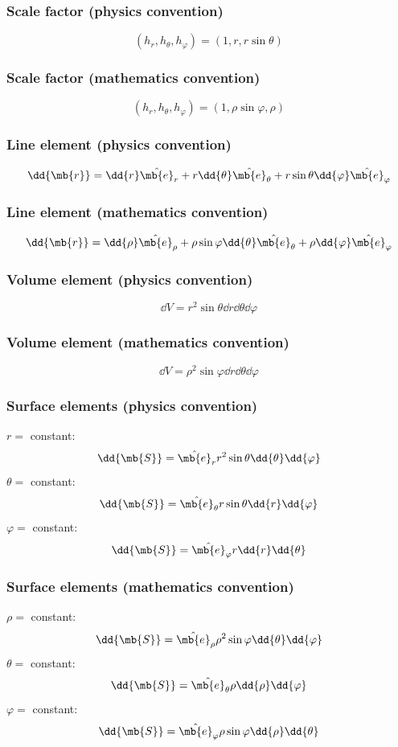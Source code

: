 \documentclass[a4paper,12pt]{report}
\begin{document}
\begin{itemize}
\begin{itemize}
\subsubsection{Scale factor (physics convention)}
\[(h_r,h_{\theta},h_{\varphi})=(1,r,r\sin\theta)\]
\subsubsection{Scale factor (mathematics convention)}
\[(h_r,h_{\theta},h_{\varphi})=(1,\rho\sin\varphi,\rho)\]
\subsubsection{Line element (physics convention)}
\[\dd{\mb{r}}=\dd{r}\hat{\mb{e}}_r+r\dd{\theta}\hat{\mb{e}}_{\theta}+r\sin\theta\dd{\varphi}\hat{\mb{e}}_{\varphi}\]
\subsubsection{Line element (mathematics convention)}
\[\dd{\mb{r}}=\dd{\rho}\hat{\mb{e}}_{\rho}+\rho\sin\varphi\dd{\theta}\hat{\mb{e}}_{\theta}+\rho\dd{\varphi}\hat{\mb{e}}_{\varphi}\]
\subsubsection{Volume element (physics convention)}
\[\dd{V}=r^2\sin\theta\dd{r}\dd{\theta}\dd{\varphi}\]
\subsubsection{Volume element (mathematics convention)}
\[\dd{V}=\rho^2\sin\varphi\dd{r}\dd{\theta}\dd{\varphi}\]
\subsubsection{Surface elements (physics convention)}
$r=$ constant:
\[\dd{\mb{S}}=\hat{\mb{e}}_rr^2\sin\theta\dd{\theta}\dd{\varphi}\]
$\theta=$ constant:
\[\dd{\mb{S}}=\hat{\mb{e}}_{\theta}r\sin\theta\dd{r}\dd{\varphi}\]
$\varphi=$ constant:
\[\dd{\mb{S}}=\hat{\mb{e}}_{\varphi}r\dd{r}\dd{\theta}\]
\subsubsection{Surface elements (mathematics convention)}
$\rho=$ constant:
\[\dd{\mb{S}}=\hat{\mb{e}}_{\rho}\rho^2\sin\varphi\dd{\theta}\dd{\varphi}\]
$\theta=$ constant:
\[\dd{\mb{S}}=\hat{\mb{e}}_{\theta}\rho\dd{\rho}\dd{\varphi}\]
$\varphi=$ constant:
\[\dd{\mb{S}}=\hat{\mb{e}}_{\varphi}\rho\sin\varphi\dd{\rho}\dd{\theta}\]




\end{itemize}
\end{itemize}
\end{document}
